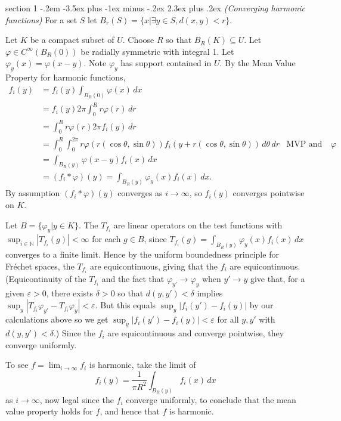 \documentclass[12pt]{article}
\makeatletter
\theoremstyle{norm}
\newcommand{\N}[0]{\mathbb{N}}
\newcommand{\rc}[1]{\frac{1}{#1}}
\newcommand{\subeq}[0]{\subseteq}
\newcommand{\de}[0]{\delta}
\newcommand{\ep}[0]{\varepsilon}
\newcommand{\ph}[0]{\varphi}
\newcommand{\te}[0]{\theta}
\newcommand{\iy}[0]{\infty}
\newenvironment{problem}{\@startsection
       {section}
       {1}
       {-.2em}
       {-3.5ex plus -1ex minus -.2ex}
       {2.3ex plus .2ex}
       {\pagebreak[3]%
       \large\bf\noindent{Problem }
       }
       }
       {%
       }
\makeatother
\begin{document}
\begin{problem}{\it (Converging harmonic functions)}
For a set $S$ let $B_r(S)=\{x|\exists y\in S, d(x,y)<r\}$.

Let $K$ be a compact subset of $U$. Choose $R$ so that $B_R(K)\subeq U$. Let $\ph\in C^{\iy}(B_R(0))$ be radially symmetric with integral 1. Let $\ph_y(x)=\ph(x-y)$. Note $\ph_y$ has support contained in $U$. By the Mean Value Property for harmonic functions,
\begin{align*}
f_i(y)&=f_i(y)\int_{B_R(0)}\ph(x)\,dx\\
&=f_i(y) 2\pi \int_0^R r\ph(r) \,dr\\
&=\int_0^R r\ph(r)2\pi f_i(y)\,dr\\
&=\int_0^R \int_0^{2\pi} r\ph(r(\cos\theta,\sin\theta)) f_i(y+r(\cos\theta,\sin\theta)) \,d\te\,dr&\text{MVP and radial symmetry of }\ph\\
&=\int_{B_R(y)} \ph(x-y)f_i(x)\,dx\\
&=(f_i*\ph)(y)=\int_{B_R(y)} \ph_y(x)f_i(x)\,dx.
\end{align*}
By assumption $(f_i*\ph)(y)$ converges as $i\to \iy$, so $f_i(y)$ converges pointwise on $K$.

Let $B=\{\ph_y|y\in K\}$. 
The $T_{f_i}$ are linear operators on the test functions with $\sup_{i\in \N}| T_{f_i}(g)|<\iy$ for each $g\in B$, since $T_{f_i}(g)=\int_{B_R(y)} \ph_y(x)f_i(x)\,dx$ converges to a finite limit. 
Hence by the uniform boundedness principle for Fr\'echet spaces, the $T_{f_i}$ are equicontinuous, giving that the $f_i$ are equicontinuous. (Equicontinuity of the $T_{f_i}$ and the fact that $\ph_{y'}\to \ph_y$ when $y'\to y$ give that, for a given $\ep>0$, there exists $\de>0$ so that $d(y,y')<\de$ implies $\sup_y| T_{f_i}\ph_{y'}-T_{f_i}\ph_{y}|<\ep$. But this equals $\sup_y| f_i(y')-f_i(y)|$ by our calculations above so we get $\sup_y| f_i(y')-f_i(y)|<\ep$ for all $y,y'$ with $d(y,y')<\de$.) 
Since the $f_i$ are equicontinuous and converge pointwise, they converge uniformly.

To see $f=\lim_{i\to \iy} f_i$ is harmonic, take the limit of
\[
f_i(y)=\rc{\pi R^2}\int_{B_R(y)} f_i(x)\,dx
\]
as $i\to \iy$, now legal since the $f_i$ converge uniformly, to conclude that the mean value property holds for $f$, and hence that $f$ is harmonic.
\end{problem}
\end{document}
